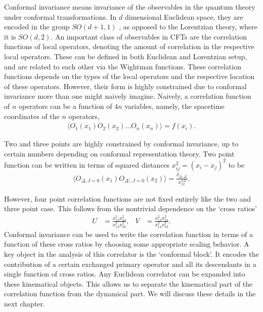 Conformal invariance means invariance of the observables in the quantum theory under conformal transformations.
In $ d $ dimensional Euclidean space, they are encoded in the group $ SO(d+1,1) $ , as opposed to the Lorentzian theory, where it is $ SO(d,2) $.
An important class of observables in CFTs are the correlation functions of local operators, denoting the amount of correlation in the respective local operators.
These can be defined in both Euclidean and Lorentzian setup, and are related to each other via the Wightman functions.
These correlation functions depends on the types of the local operators and the respective location of these operators.
However, their form is highly constrained due to conformal invariance more than one might naively imagine.
Naively, a correlation function of $ n $ operators can be a function of $ 4n $ variables, namely, the spacetime coordinates of the $ n $ operators,
\begin{align}
  \langle  O_1\left( x_1 \right)O_2\left( x_2 \right) \dots  O_n\left( x_n \right)\rangle = f\left( x_i \right)
  .
\end{align}

Two and three points are highly constrained by conformal invariance, up to certain numbers depending on conformal representation theory.
Two point function can be written in terms of squared distances $ x_{ij}^2  = (x_i-x_j)^2 $ to be \cite{Poland:2018epd}
\begin{align}
  \langle O_{\Delta,J=0}\left( x_1 \right)O_{\Delta',J=0}\left( x_2 \right)\rangle = \frac{\delta_{\Delta,\Delta'}}{x_{12}^{2\Delta}}
  .
\end{align}

However, four point correlation functions are not fixed entirely like the two and three point case. This follows from the nontrivial dependence on the `cross ratios' \cite{Poland:2018epd}
\begin{align}
  U & =\frac{x_{12}^2x_{34}^2 }{x_{14}^2x_{32}^2 } , & V & =\frac{x_{13}^2x_{24}^2 }{x_{14}^2x_{23}^2 }
  .
\end{align}
Conformal invariance can be used to write the correlation function in terms of a function of these cross ratios by choosing some appropriate scaling behavior.
A key object in the analysis of this correlator is the `conformal block'.
It encodes the contribution of a certain exchanged primary operator and all its descendants in a single function of cross ratios.
Any Euclidean correlator can be expanded into these kinematical objects.
This allows us to separate the kinematical part of the correlation function from the dynamical part.
We will discuss these details in the next chapter.
